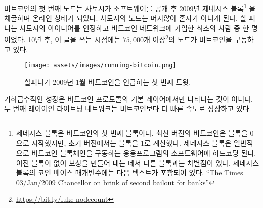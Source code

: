 \begin{comment}
	Bitcoin's first node went online in 2009 after Satoshi mined the \textit{genesis
		block}\footnote{The genesis block is the first block of the Bitcoin block chain.
		Modern versions of Bitcoin number it as block $0$, though very early versions
		counted it as block $1$. The genesis block is usually hardcoded into the
		software of the applications that utilize the Bitcoin block chain. It is a
		special case in that it does not reference a previous block and produces an
		unspendable subsidy. The \textit{coinbase} parameter contains, along with the
		normal data, the following text: \textit{\enquote{The Times 03/Jan/2009 Chancellor on
				brink of second bailout for banks}} \cite{btcwiki:genesis-block}} and released
	the software into the wild. His node wasn't alone for long. Hal Finney was one
	of the first people to pick up on the idea and join the network. Ten years
	later, as of this writing, more than
	$75.000$\footnote{\url{https://bit.ly/luke-nodecount}} nodes are running
	bitcoin.
\end{comment}
비트코인의 첫 번째 노드는 사토시가 소프트웨어를 공개 후 2009년 제네시스 블록\footnote{
	제네시스 블록은 비트코인의 첫 번째 블록이다. 최신 버전의 비트코인은
	블록을 $0$으로 시작했지만, 초기 버전에서는 블록을 $1$로 계산했다.
	제네시스 블록은 일반적으로 비트코인 블록체인을 구동하는 응용프로그램의 소프트웨어에
	하드코딩 된다. 이전 블록이 없이 보상을 만들어 내는 데서 다른 블록과는 차별점이 있다.
	제네시스 블록의 코인 베이스 매개변수에는 다음 텍스트가 포함되어 있다.
	\enquote{The Times 03/Jan/2009 Chancellor on brink of second bailout for banks}\cite{btcwiki:genesis-block}}
을 채굴하며 온라인 상태가 되었다.
사토시의 노드는 머지않아 혼자가 아니게 된다.
할 피니는 사토시의 아이디어를 인정하고 비트코인 네트워크에 가입한 최초의 사람 중 한 명이었다.
10년 후, 이 글을 쓰는 시점에는 $75,000$개 이상\footnote{\url{https://bit.ly/luke-nodecount}}의 노드가 비트코인을 구동하고 있다.

\begin{figure}
	\centering
	\texttt{[image: assets/images/running-bitcoin.png]}
	\caption{할피니가 2009년 1월 비트코인을 언급하는 첫 번째 트윗.}
	\label{fig:running-bitcoin}
\end{figure}

\begin{comment}
	The protocol's base layer isn't the only thing growing exponentially.
	The lightning network, a second layer technology, is growing at an even
	faster rate.
\end{comment}
기하급수적인 성장은 비트코인 프로토콜의 기본 레이어에서만 나타나는 것이 아니다.
두 번째 레이어인 라이트닝 네트워크는 비트코인보다 더 빠른 속도로 성장하고 있다.

